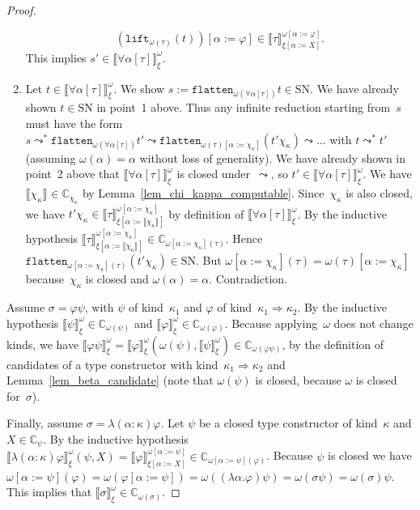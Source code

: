 \documentclass[runningheads,a4paper]{llncs}
\newcommand{\arrkind}{\Rightarrow}
\newcommand{\subst}[2]{#1:=#2}
\newcommand{\flatten}{\mathtt{flatten}}
\newcommand{\lift}{\mathtt{lift}}
\newcommand{\SN}{\mathrm{SN}}
\newcommand{\Cb}{\mathbb{C}}
\newcommand{\val}[3]{\ensuremath{\llbracket#1\rrbracket_{#2}^{#3}}}
\begin{document}
\begin{proof}
\begin{enumerate}
\[    (\lift_{\omega(\tau)}(t))[\subst{\alpha}{\varphi}] \in
    \val{\tau}{\xi[\subst{\alpha}{X}]}{\omega[\subst{\alpha}{\varphi}]}.
    \]
    This implies $s' \in \val{\forall\alpha[\tau]}{\xi}{\omega}$.
  \item Let $t \in \val{\forall\alpha[\tau]}{\xi}{\omega}$. We show $s
    := \flatten_{\omega(\forall\alpha[\tau])}t \in \SN$. We have
    already shown $t \in \SN$ in point~1 above. Thus any infinite
    reduction starting from~$s$ must have the form $s \leadsto^*
    \flatten_{\omega(\forall\alpha[\tau])}t' \leadsto
    \flatten_{\omega(\tau)[\subst{\alpha}{\chi_\kappa}]}(t'
    \chi_\kappa) \leadsto \ldots$ with $t \leadsto^* t'$ (assuming
    $\omega(\alpha) = \alpha$ without loss of generality). We have
    already shown in point~2 above that
    $\val{\forall\alpha[\tau]}{\xi}{\omega}$ is closed
    under~$\leadsto$, so $t' \in
    \val{\forall\alpha[\tau]}{\xi}{\omega}$. We have
    $\val{\chi_\kappa}{}{} \in \Cb_{\chi_\kappa}$ by
    Lemma~\ref{lem_chi_kappa_computable}. Since~$\chi_\kappa$ is also
    closed, we have $t' \chi_\kappa \in
    \val{\tau}{\xi[\subst{\alpha}{\val{\chi_\kappa}{}{}}]}{\omega[\subst{\alpha}{\chi_\kappa}]}$
    by definition of $\val{\forall\alpha[\tau]}{\xi}{\omega}$. By the
    inductive hypothesis
    $\val{\tau}{\xi[\subst{\alpha}{\val{\chi_\kappa}{}{}}]}{\omega[\subst{\alpha}{\chi_\kappa}]}
    \in \Cb_{\omega[\subst{\alpha}{\chi_\kappa}](\tau)}$. Hence
    $\flatten_{\omega[\subst{\alpha}{\chi_\kappa}](\tau)}(t'\chi_\kappa)\in\SN$. But
    $\omega[\subst{\alpha}{\chi_\kappa}](\tau) =
    \omega(\tau)[\subst{\alpha}{\chi_\kappa}]$ because~$\chi_\kappa$
    is closed and $\omega(\alpha) = \alpha$. Contradiction.
  \end{enumerate}

  Assume $\sigma = \varphi\psi$, with $\psi$ of kind~$\kappa_1$ and
  $\varphi$ of kind~$\kappa_1\arrkind\kappa_2$. By the inductive
  hypothesis $\val{\psi}{\xi}{\omega} \in \Cb_{\omega(\psi)}$ and
  $\val{\varphi}{\xi}{\omega} \in \Cb_{\omega(\varphi)}$. Because
  applying~$\omega$ does not change kinds, we have
  $\val{\varphi\psi}{\xi}{\omega} =
  \val{\varphi}{\xi}{\omega}(\omega(\psi), \val{\psi}{\xi}{\omega})
  \in \Cb_{\omega(\varphi\psi)}$, by the definition of candidates of a
  type constructor with kind~$\kappa_1\arrkind\kappa_2$ and
  Lemma~\ref{lem_beta_candidate} (note that $\omega(\psi)$ is closed,
  because $\omega$ is closed for~$\sigma$).

  Finally, assume $\sigma = \lambda(\alpha:\kappa)\varphi$. Let $\psi$
  be a closed type constructor of kind~$\kappa$ and $X \in
  \Cb_{\psi}$. By the inductive hypothesis
  $\val{\lambda(\alpha:\kappa)\varphi}{\xi}{\omega}(\psi,X) =
  \val{\varphi}{\xi[\subst{\alpha}{X}]}{\omega[\subst{\alpha}{\psi}]}
  \in \Cb_{\omega[\subst{\alpha}{\psi}](\varphi)}$. Because $\psi$ is
  closed we have $\omega[\subst{\alpha}{\psi}](\varphi) =
  \omega(\varphi[\subst{\alpha}{\psi}]) =
  \omega((\lambda\alpha.\varphi)\psi) = \omega(\sigma\psi) =
  \omega(\sigma)\psi$. This implies that $\val{\sigma}{\xi}{\omega}
  \in \Cb_{\omega(\sigma)}$.
\end{proof}
\end{document}
